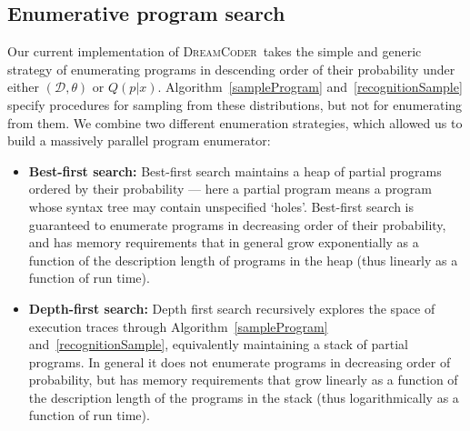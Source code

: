 \documentclass{article}
\newcommand{\system}{\textsc{DreamCoder}~}
\begin{document}
\subsection{Enumerative program search}\label{enumerationAppendix}

Our current implementation of \system takes the simple and generic strategy of enumerating programs in
descending order of their probability under either $(\mathcal{D},\theta)$ or $Q(p|x)$.
Algorithm~\ref{sampleProgram} and~\ref{recognitionSample}
specify procedures for sampling
from these distributions,
but not for enumerating from them.
We combine two different enumeration strategies,
which allowed us to build a massively parallel program enumerator:
\begin{itemize}
\item \textbf{Best-first search:} Best-first search maintains a heap of
  partial programs ordered by their
  probability --- here a partial program means a program whose syntax tree
  may contain unspecified `holes'. Best-first search
  is guaranteed to enumerate programs in decreasing order of their probability,
  and has memory requirements that in general grow exponentially as a function of the description length of programs in the heap (thus linearly as a function of run time).
\item \textbf{Depth-first search:} Depth first search
  recursively explores the space of
  execution traces through Algorithm~\ref{sampleProgram} and~\ref{recognitionSample},
  equivalently maintaining a stack of partial programs.  
  In general it does not enumerate programs
  in decreasing order of probability,
  but has memory requirements that grow linearly as a function of the description length of the programs in the stack (thus logarithmically as a function of run time).
\end{itemize}
\end{document}
